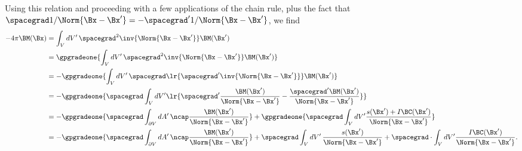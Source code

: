 %
%

Using this relation and proceeding with a few applications of the chain rule, plus the fact that \( \spacegrad 1/\Norm{\Bx - \Bx'} = -\spacegrad' 1/\Norm{\Bx - \Bx'} \), we find
%
%
%
\begin{equation}\label{eqn:helmholtzDerviationMultivectorSolution:720}
\begin{aligned}
-4 \pi \BM(\Bx)
&= \int_V dV'\, \spacegrad^2 \inv{\Norm{\Bx - \Bx'}} \BM(\Bx') \\
&= \gpgradeone{\int_V dV'\, \spacegrad^2 \inv{\Norm{\Bx - \Bx'}} \BM(\Bx')} \\
&= -\gpgradeone{\int_V dV'\, \spacegrad \lr{ \spacegrad' \inv{\Norm{\Bx - \Bx'}}} \BM(\Bx')} \\
&= -\gpgradeone{\spacegrad \int_V dV' \lr{
   \spacegrad' \frac{\BM(\Bx')}{\Norm{\Bx - \Bx'}}
   -\frac{\spacegrad' \BM(\Bx')}{\Norm{\Bx - \Bx'}}
   } } \\
&= -\gpgradeone{\spacegrad \int_{\partial V} dA'\,
   \ncap \frac{\BM(\Bx')}{\Norm{\Bx - \Bx'}}
    }
   +\gpgradeone{\spacegrad \int_V dV'
   \frac{s(\Bx') + I\BC(\Bx')}{\Norm{\Bx - \Bx'}}
    } \\
&= -\gpgradeone{\spacegrad \int_{\partial V} dA'\,
   \ncap \frac{\BM(\Bx')}{\Norm{\Bx - \Bx'}}
    }
   +\spacegrad \int_V dV'\,
   \frac{s(\Bx')}{\Norm{\Bx - \Bx'}}
   +\spacegrad \cdot \int_V dV'
   \frac{I\BC(\Bx')}{\Norm{\Bx - \Bx'}}.
\end{aligned}
\end{equation}

